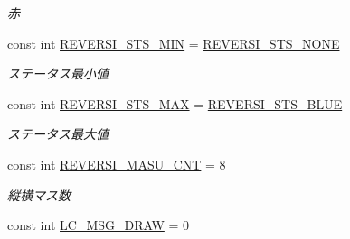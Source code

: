 \begin{DoxyCompactItemize}
\begin{DoxyCompactList}\small\item\em 赤 \end{DoxyCompactList}\item 
const int \hyperlink{class_reversi4color_wpf_1_1_reversi_const_a9fe2d5a078ab4dd43d2b427f9786ea10}{R\+E\+V\+E\+R\+S\+I\+\_\+\+S\+T\+S\+\_\+\+M\+IN} = \hyperlink{class_reversi4color_wpf_1_1_reversi_const_a4de827ef80e8015214124722ddb5a325}{R\+E\+V\+E\+R\+S\+I\+\_\+\+S\+T\+S\+\_\+\+N\+O\+NE}\hypertarget{class_reversi4color_wpf_1_1_reversi_const_a9fe2d5a078ab4dd43d2b427f9786ea10}{}\label{class_reversi4color_wpf_1_1_reversi_const_a9fe2d5a078ab4dd43d2b427f9786ea10}

\begin{DoxyCompactList}\small\item\em ステータス最小値 \end{DoxyCompactList}\item 
const int \hyperlink{class_reversi4color_wpf_1_1_reversi_const_a592a6b4580533423043ec11a3d26f841}{R\+E\+V\+E\+R\+S\+I\+\_\+\+S\+T\+S\+\_\+\+M\+AX} = \hyperlink{class_reversi4color_wpf_1_1_reversi_const_a024ba59e7746d771e826dde7a58fa8d1}{R\+E\+V\+E\+R\+S\+I\+\_\+\+S\+T\+S\+\_\+\+B\+L\+UE}\hypertarget{class_reversi4color_wpf_1_1_reversi_const_a592a6b4580533423043ec11a3d26f841}{}\label{class_reversi4color_wpf_1_1_reversi_const_a592a6b4580533423043ec11a3d26f841}

\begin{DoxyCompactList}\small\item\em ステータス最大値 \end{DoxyCompactList}\item 
const int \hyperlink{class_reversi4color_wpf_1_1_reversi_const_a919acb4ec74b60cd8ce989d7c671f2d8}{R\+E\+V\+E\+R\+S\+I\+\_\+\+M\+A\+S\+U\+\_\+\+C\+NT} = 8\hypertarget{class_reversi4color_wpf_1_1_reversi_const_a919acb4ec74b60cd8ce989d7c671f2d8}{}\label{class_reversi4color_wpf_1_1_reversi_const_a919acb4ec74b60cd8ce989d7c671f2d8}

\begin{DoxyCompactList}\small\item\em 縦横マス数 \end{DoxyCompactList}\item 
const int \hyperlink{class_reversi4color_wpf_1_1_reversi_const_a36f79de58709000116f04f1fb68c77b1}{L\+C\+\_\+\+M\+S\+G\+\_\+\+D\+R\+AW} = 0\hypertarget{class_reversi4color_wpf_1_1_reversi_const_a36f79de58709000116f04f1fb68c77b1}{}\label{class_reversi4color_wpf_1_1_reversi_const_a36f79de58709000116f04f1fb68c77b1}


\end{DoxyCompactItemize}
